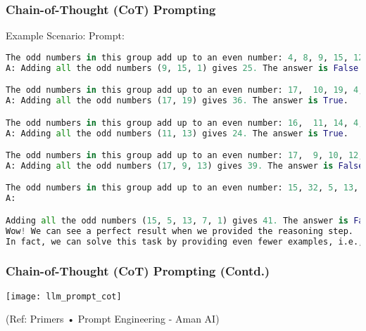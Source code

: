 \begin{frame}[fragile]\frametitle{Chain-of-Thought (CoT) Prompting}

Example Scenario: Prompt:


\begin{lstlisting}[language=python]
The odd numbers in this group add up to an even number: 4, 8, 9, 15, 12, 2, 1.
A: Adding all the odd numbers (9, 15, 1) gives 25. The answer is False.

The odd numbers in this group add up to an even number: 17,  10, 19, 4, 8, 12, 24.
A: Adding all the odd numbers (17, 19) gives 36. The answer is True.

The odd numbers in this group add up to an even number: 16,  11, 14, 4, 8, 13, 24.
A: Adding all the odd numbers (11, 13) gives 24. The answer is True.

The odd numbers in this group add up to an even number: 17,  9, 10, 12, 13, 4, 2.
A: Adding all the odd numbers (17, 9, 13) gives 39. The answer is False.

The odd numbers in this group add up to an even number: 15, 32, 5, 13, 82, 7, 1.
A:

Adding all the odd numbers (15, 5, 13, 7, 1) gives 41. The answer is False.
Wow! We can see a perfect result when we provided the reasoning step. 
In fact, we can solve this task by providing even fewer examples, i.e., just one example seems enough:
\end{lstlisting}


\end{frame}

\begin{frame}[fragile]\frametitle{Chain-of-Thought (CoT) Prompting (Contd.)}


\begin{center}
\texttt{[image: llm\_prompt\_cot]}

{\tiny (Ref: Primers • Prompt Engineering - Aman AI)}

\end{center}				
			

\end{frame}

